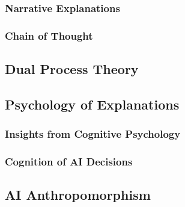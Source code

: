 \subsubsection{Narrative Explanations} \label{sssec:narrative_explanations}

\cite{Martens2025}

\subsubsection{Chain of Thought} \label{sssec:chain_of_thought}

\subsection{Dual Process Theory} \label{ssec:dual_process_theory}

\cite{Kahnemann2011}

\subsection{Psychology of Explanations} \label{ssec:psychology_of_explanations}

\subsubsection{Insights from Cognitive Psychology} \label{sssec:insights_from_cognitive_psychology}

\cite{Miller2019}

\subsubsection{Cognition of AI Decisions}

\cite{Jussupow2021}

\cite{Shin2021}

\subsection{AI Anthropomorphism} \label{ssec:ai_antropomorphism}
